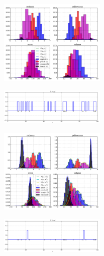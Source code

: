 \begin{multicols}{2}
\begin{figure}[H]
  \centering
		\includegraphics[width=0.45\textwidth]{images/not_normed_new.png}
\end{figure}
\vspace{5mm}

\begin{figure}[H]
  \centering
		\includegraphics[width=0.45\textwidth]{images/results_new_not_normed.png}
\end{figure}
\vspace{5mm}

\begin{figure}[H]
  \centering
		\includegraphics[width=0.45\textwidth]{images/normed_new.png}
\end{figure}
\vspace{5mm}

\begin{figure}[H]
  \centering
		\includegraphics[width=0.45\textwidth]{images/results_new_normed.png}
\end{figure}
\vspace{5mm}

\end{multicols}





